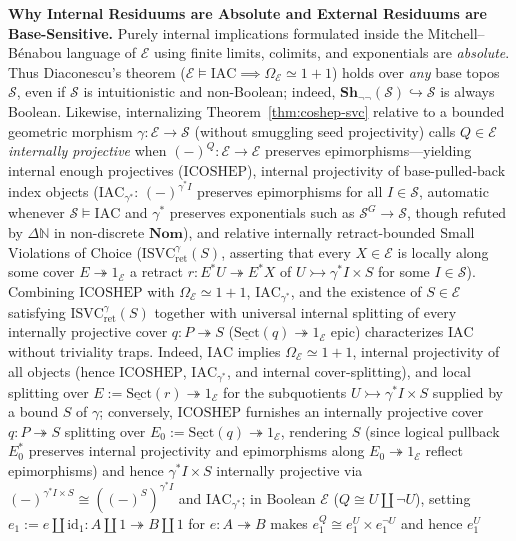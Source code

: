\documentclass[10pt,twoside,openright]{book}
\theoremstyle{crmplain}
\theoremstyle{crmdef}
\theoremstyle{crmremark}
\begin{document}
\textbf{Why Internal Residuums are Absolute and External Residuums are Base-Sensitive.} Purely internal implications formulated inside the Mitchell--Bénabou language of $\mathcal{E}$ using finite limits, colimits, and exponentials are \emph{absolute}. Thus Diaconescu's theorem ($\mathcal{E} \models \mathrm{IAC} \implies \Omega_{\mathcal{E}} \simeq 1+1$) holds over \emph{any} base topos $\mathcal{S}$, even if $\mathcal{S}$ is intuitionistic and non-Boolean; indeed, $\mathbf{Sh}_{\neg\neg}(\mathcal{S}) \hookrightarrow \mathcal{S}$ is always Boolean. Likewise, internalizing Theorem~\ref{thm:coshep-svc} relative to a bounded geometric morphism $\gamma : \mathcal{E} \to \mathcal{S}$ (without smuggling seed projectivity) calls $Q \in \mathcal{E}$ \emph{internally projective} when $(-)^Q : \mathcal{E} \to \mathcal{E}$ preserves epimorphisms---yielding internal enough projectives ($\mathrm{ICOSHEP}$), internal projectivity of base-pulled-back index objects ($\mathrm{IAC}_{\gamma^*}$: $(-)^{\gamma^* I}$ preserves epimorphisms for all $I \in \mathcal{S}$, automatic whenever $\mathcal{S} \models \mathrm{IAC}$ and $\gamma^*$ preserves exponentials such as $\mathcal{S}^G \to \mathcal{S}$, though refuted by $\Delta\mathbb{N}$ in non-discrete $\mathbf{Nom}$), and relative internally retract-bounded Small Violations of Choice ($\mathrm{ISVC}_{\mathrm{ret}}^{\gamma}(S)$, asserting that every $X \in \mathcal{E}$ is locally along some cover $E \twoheadrightarrow 1_{\mathcal{E}}$ a retract $r : E^* U \twoheadrightarrow E^* X$ of $U \rightarrowtail \gamma^* I \times S$ for some $I \in \mathcal{S}$). Combining $\mathrm{ICOSHEP}$ with $\Omega_{\mathcal{E}} \simeq 1+1$, $\mathrm{IAC}_{\gamma^*}$, and the existence of $S \in \mathcal{E}$ satisfying $\mathrm{ISVC}_{\mathrm{ret}}^{\gamma}(S)$ together with universal internal splitting of every internally projective cover $q : P \twoheadrightarrow S$ ($\underline{\mathrm{Sect}}(q) \twoheadrightarrow 1_{\mathcal{E}}$ epic) characterizes $\mathrm{IAC}$ without triviality traps. Indeed, $\mathrm{IAC}$ implies $\Omega_{\mathcal{E}} \simeq 1+1$, internal projectivity of all objects (hence $\mathrm{ICOSHEP}$, $\mathrm{IAC}_{\gamma^*}$, and internal cover-splitting), and local splitting over $E := \underline{\mathrm{Sect}}(r) \twoheadrightarrow 1_{\mathcal{E}}$ for the subquotients $U \rightarrowtail \gamma^* I \times S$ supplied by a bound $S$ of $\gamma$; conversely, $\mathrm{ICOSHEP}$ furnishes an internally projective cover $q : P \twoheadrightarrow S$ splitting over $E_0 := \underline{\mathrm{Sect}}(q) \twoheadrightarrow 1_{\mathcal{E}}$, rendering $S$ (since logical pullback $E_0^*$ preserves internal projectivity and epimorphisms along $E_0 \twoheadrightarrow 1_{\mathcal{E}}$ reflect epimorphisms) and hence $\gamma^* I \times S$ internally projective via $(-)^{\gamma^* I \times S} \cong ((-)^S)^{\gamma^* I}$ and $\mathrm{IAC}_{\gamma^*}$; in Boolean $\mathcal{E}$ ($Q \cong U \amalg \neg U$), setting $e_1 := e \amalg \mathrm{id}_1 : A \amalg 1 \twoheadrightarrow B \amalg 1$ for $e : A \twoheadrightarrow B$ makes $e_1^Q \cong e_1^U \times e_1^{\neg U}$ and hence $e_1^U$ 
\end{document}
